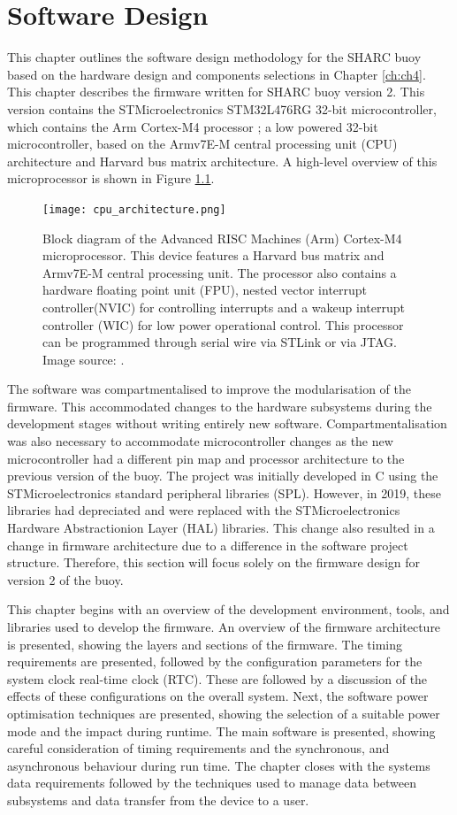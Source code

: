 \chapter{Software Design}
\label{ch:ch5}
This chapter outlines the software design methodology for the SHARC buoy based on the hardware design and components selections in Chapter \ref{ch:ch4}. This chapter describes the firmware written for SHARC buoy version 2. This version contains the STMicroelectronics STM32L476RG 32-bit microcontroller, \cite{stm32l4} which contains the Arm Cortex-M4 processor \cite{ARMprocessor}; a low powered 32-bit microcontroller, based on the Armv7E-M central processing unit (CPU) architecture and Harvard bus matrix architecture. A high-level overview of this microprocessor is shown in Figure \ref{fig:cpu}.

\begin{figure}[H]
	\centering
	\texttt{[image: cpu\_architecture.png]}
	\caption{Block diagram of the Advanced RISC Machines (Arm) Cortex-M4 microprocessor. This device features a Harvard bus matrix and Armv7E-M central processing unit. The processor also contains a hardware floating point unit (FPU), nested vector interrupt controller(NVIC) for controlling interrupts and a wakeup interrupt controller (WIC) for low power operational control. This processor can be programmed through serial wire via STLink or via JTAG. Image source: \cite{ARMprocessor}. }
	\label{fig:cpu}
\end{figure}

The software was compartmentalised to improve the modularisation of the firmware. This accommodated changes to the hardware subsystems during the development stages without writing entirely new software. Compartmentalisation was also necessary to accommodate microcontroller changes as the new microcontroller had a different pin map and processor architecture to the previous version of the buoy. The project was initially developed in C using the STMicroelectronics standard peripheral libraries (SPL). However, in 2019, these libraries had depreciated and were replaced with the STMicroelectronics Hardware Abstractionion Layer (HAL) libraries. This change also resulted in a change in firmware architecture due to a difference in the software project structure. Therefore, this section will focus solely on the firmware design for version 2 of the buoy.

This chapter begins with an overview of the development environment, tools, and libraries used to develop the firmware. An overview of the firmware architecture is presented, showing the layers and sections of the firmware. The timing requirements are presented, followed by the configuration parameters for the system clock real-time clock (RTC). These are followed by a discussion of the effects of these configurations on the overall system. Next, the software power optimisation techniques are presented, showing the selection of a suitable power mode and the impact during runtime. The main software is presented, showing careful consideration of timing requirements and the synchronous, and asynchronous behaviour during run time. The chapter closes with the systems data requirements followed by the techniques used to manage data between subsystems and data transfer from the device to a user.

